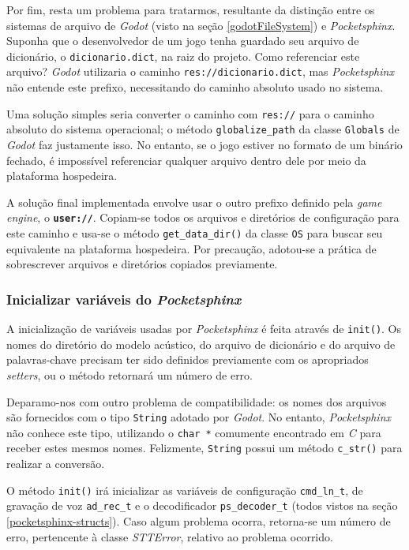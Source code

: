Por fim, resta um problema para tratarmos, resultante da distinção entre os sistemas de arquivo de \textit{Godot} (visto na seção \ref{godotFileSystem}) e \textit{Pocketsphinx}. Suponha que o desenvolvedor de um jogo tenha guardado seu arquivo de dicionário, o \texttt{dicionario.dict}, na raiz do projeto. Como referenciar este arquivo? \textit{Godot} utilizaria o caminho \texttt{res://dicionario.dict}, mas \textit{Pocketsphinx} não entende este prefixo, necessitando do caminho absoluto usado no sistema.

Uma solução simples seria converter o caminho com \texttt{res://} para o caminho absoluto do sistema operacional; o método \texttt{globalize\_path} da classe \texttt{Globals} de \textit{Godot} faz justamente isso. No entanto, se o jogo estiver no formato de um binário fechado, é impossível referenciar qualquer arquivo dentro dele por meio da plataforma hospedeira.

A solução final implementada envolve usar o outro prefixo definido pela \textit{game engine}, o \textbf{\texttt{user://}}. Copiam-se todos os arquivos e diretórios de configuração para este caminho e usa-se o método \texttt{get\_data\_dir()} da classe \texttt{OS} para buscar seu equivalente na plataforma hospedeira. Por precaução, adotou-se a prática de sobrescrever arquivos e diretórios copiados previamente.

\subsubsection{Inicializar variáveis do \textit{Pocketsphinx}}

A inicialização de variáveis usadas por \textit{Pocketsphinx} é feita através de \texttt{init()}. Os nomes do diretório do modelo acústico, do arquivo de dicionário e do arquivo de palavras-chave precisam ter sido definidos previamente com os apropriados \textit{setters}, ou o método retornará um número de erro.

Deparamo-nos com outro problema de compatibilidade: os nomes dos arquivos são fornecidos com o tipo \texttt{String} adotado por \textit{Godot}. No entanto, \textit{Pocketsphinx} não conhece este tipo, utilizando o \texttt{char *} comumente encontrado em \textit{C} para receber estes mesmos nomes. Felizmente, \texttt{String} possui um método \texttt{c\_str()} para realizar a conversão.

O método \texttt{init()} irá inicializar as variáveis de configuração \texttt{cmd\_ln\_t}, de gravação de voz \texttt{ad\_rec\_t} e o decodificador \texttt{ps\_decoder\_t} (todos vistos na seção \ref{pocketsphinx-structs}). Caso algum problema ocorra, retorna-se um número de erro, pertencente à classe \textit{STTError}, relativo ao problema ocorrido.

